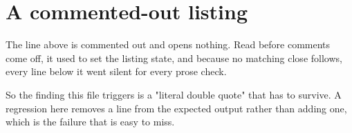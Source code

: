 \section{A commented-out listing}
\label{sec:ch01-commented-begin}

The line above is commented out and opens nothing. Read before comments come
off, it used to set the listing state, and because no matching close follows,
every line below it went silent for every prose check.

So the finding this file triggers is a "literal double quote" that has to
survive. A regression here removes a line from the expected output rather than
adding one, which is the failure that is easy to miss.
